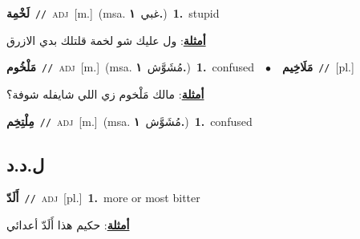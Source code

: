 \documentclass[10pt,a4paper,twoside]{article} %
\begin{document}
\begin{multicols}{2}
{\setlength\topsep{0pt}\textbf{\foreignlanguage{arabic}{لَخْمِة}}\ {\color{gray}\texttt{//}\color{black}}\ \textsc{adj}\ [m.]\ \color{gray}(msa. \foreignlanguage{arabic}{غبي}~\foreignlanguage{arabic}{\textbf{١.}})\color{black}\ \textbf{1.}~stupid\  \begin{flushright}\color{gray}\foreignlanguage{arabic}{\textbf{\underline{\foreignlanguage{arabic}{أمثلة}}}: ول عليك شو لخمة قلتلك بدي الازرق}\end{flushright}\color{black}} \vspace{2mm}

{\setlength\topsep{0pt}\textbf{\foreignlanguage{arabic}{مَلْخُوم}}\ {\color{gray}\texttt{//}\color{black}}\ \textsc{adj}\ [m.]\ \color{gray}(msa. \foreignlanguage{arabic}{مُشَوَّش}~\foreignlanguage{arabic}{\textbf{١.}})\color{black}\ \textbf{1.}~confused\ \ $\bullet$\ \ \setlength\topsep{0pt}\textbf{\foreignlanguage{arabic}{مَلَاخِيم}}\ {\color{gray}\texttt{//}\color{black}}\ [pl.]\  \begin{flushright}\color{gray}\foreignlanguage{arabic}{\textbf{\underline{\foreignlanguage{arabic}{أمثلة}}}: مالك مَلْخوم زي اللي شايفله شوفة؟}\end{flushright}\color{black}} \vspace{2mm}

{\setlength\topsep{0pt}\textbf{\foreignlanguage{arabic}{مِلْتِخِم}}\ {\color{gray}\texttt{//}\color{black}}\ \textsc{adj}\ [m.]\ \color{gray}(msa. \foreignlanguage{arabic}{مُشَوَّش}~\foreignlanguage{arabic}{\textbf{١.}})\color{black}\ \textbf{1.}~confused\ } \vspace{2mm}

\vspace{-3mm}
\subsection*{\color{blue}\foreignlanguage{arabic}{ل.د.د}\color{blue}{}} 

{\setlength\topsep{0pt}\textbf{\foreignlanguage{arabic}{أَلَدّ}}\ {\color{gray}\texttt{//}\color{black}}\ \textsc{adj}\ [pl.]\ \textbf{1.}~more or most bitter\  \begin{flushright}\color{gray}\foreignlanguage{arabic}{\textbf{\underline{\foreignlanguage{arabic}{أمثلة}}}: حكيم هذا أَلَدّ أعدائي}\end{flushright}\color{black}} \vspace{2mm}


\end{multicols}
\end{document}
